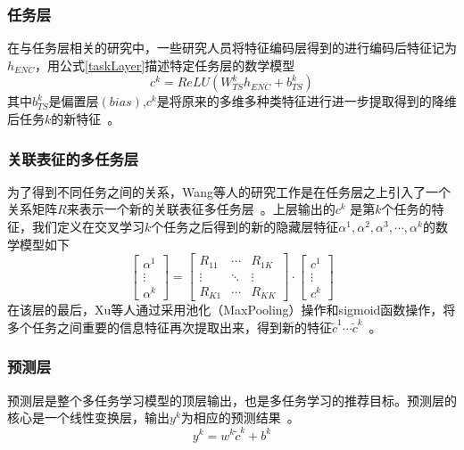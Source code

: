 \documentclass{llncs}
\begin{document}
\subsubsection{任务层}
在与任务层相关的研究中，一些研究人员将特征编码层得到的进行编码后特征记为$h_{ENC}$，用公式\ref{taskLayer}描述特定任务层的数学模型
\begin{equation}
	\label{taskLayer}
	c^k=ReLU(W_{TS}^kh_{ENC}+b_{TS}^k)
\end{equation}
其中$b_{TS}^k$是偏置层$(bias)$,$c^k$是将原来的多维多种类特征进行进一步提取得到的降维后任务$k$的新特征~\cite{Held2017Analyzing}。
\subsubsection{关联表征的多任务层}
为了得到不同任务之间的关系，Wang等人的研究工作是在任务层之上引入了一个关系矩阵$R$来表示一个新的关联表征多任务层~\cite{wang2016place}。上层输出的$c^k$ 是第$k$个任务的特征，我们定义在交叉学习$k$个任务之后得到的新的隐藏层特征$\alpha^1,\alpha^2,\alpha^3,\cdots,\alpha^k$的数学模型如下
$$\begin{bmatrix}\alpha^1\\\vdots\\\alpha^k\end{bmatrix}=\begin{bmatrix}R_{11}&\cdots&R_{1K}\\\vdots&\ddots&\vdots\\R_{K1}&\cdots&R_{KK}\end{bmatrix}\cdot\begin{bmatrix}c^1\\\vdots\\c^k\end{bmatrix}$$
在该层的最后，Xu等人通过采用池化（MaxPooling）操作和sigmoid函数操作，将多个任务之间重要的信息特征再次提取出来，得到新的特征$\widetilde c^1\cdots\widetilde c^k$~\cite{xu2016demand,ioffe2015batch}。
\subsubsection{预测层}
预测层是整个多任务学习模型的顶层输出，也是多任务学习的推荐目标。预测层的核心是一个线性变换层，输出$y^k$为相应的预测结果~\cite{Long2017Learning}。
$$y^k=w^k\widetilde c^k+b^k$$
\end{document}

